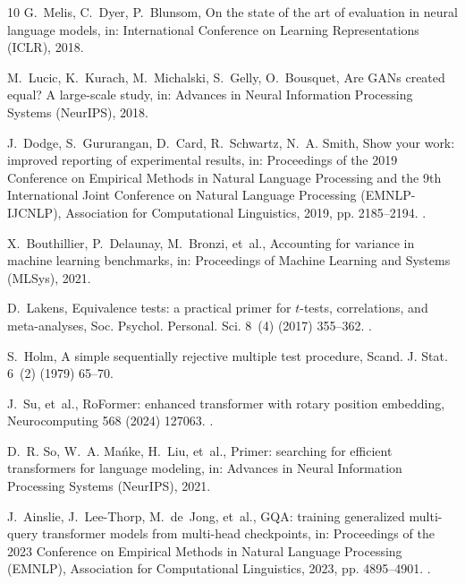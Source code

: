 \documentclass[final,5p,times,twocolumn]{elsarticle}
\theoremstyle{remark}
\begin{document}
\begin{thebibliography}{10}
G.~Melis, C.~Dyer, P.~Blunsom, {On the state of the art of evaluation in neural
  language models}, in: International Conference on Learning Representations
  (ICLR), 2018.

M.~Lucic, K.~Kurach, M.~Michalski, S.~Gelly, O.~Bousquet, {Are GANs created
  equal? A large-scale study}, in: Advances in Neural Information Processing
  Systems (NeurIPS), 2018.

J.~Dodge, S.~Gururangan, D.~Card, R.~Schwartz, N.~A. Smith, {Show your work:
  improved reporting of experimental results}, in: Proceedings of the 2019
  Conference on Empirical Methods in Natural Language Processing and the 9th
  International Joint Conference on Natural Language Processing (EMNLP-IJCNLP),
  Association for Computational Linguistics, 2019, pp. 2185--2194.
\newblock \href {https://doi.org/10.18653/v1/D19-1224}
  {}.

X.~Bouthillier, P.~Delaunay, M.~Bronzi, et~al., {Accounting for variance in
  machine learning benchmarks}, in: Proceedings of Machine Learning and Systems
  (MLSys), 2021.

D.~Lakens, {Equivalence tests: a practical primer for $t$-tests, correlations,
  and meta-analyses}, Soc. Psychol. Personal. Sci. 8~(4) (2017) 355--362.
\newblock \href {https://doi.org/10.1177/1948550617697177}
  {}.

S.~Holm, {A simple sequentially rejective multiple test procedure}, Scand. J.
  Stat. 6~(2) (1979) 65--70.

J.~Su, et~al., {RoFormer: enhanced transformer with rotary position embedding},
  Neurocomputing 568 (2024) 127063.
\newblock \href {https://doi.org/10.1016/j.neucom.2023.127063}
  {}.

D.~R. So, W.~A. Ma{\'n}ke, H.~Liu, et~al., {Primer: searching for efficient
  transformers for language modeling}, in: Advances in Neural Information
  Processing Systems (NeurIPS), 2021.

J.~Ainslie, J.~Lee-Thorp, M.~de~Jong, et~al., {GQA: training generalized
  multi-query transformer models from multi-head checkpoints}, in: Proceedings
  of the 2023 Conference on Empirical Methods in Natural Language Processing
  (EMNLP), Association for Computational Linguistics, 2023, pp. 4895--4901.
\newblock \href {https://doi.org/10.18653/v1/2023.emnlp-main.298}
  {}.


\end{thebibliography}
\end{document}

